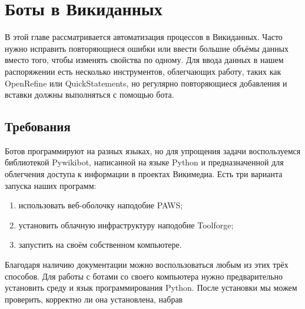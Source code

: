 \chapter{Боты в Викиданных}
\label{ch:bots}

В этой главе рассматривается автоматизация процессов в Викиданных. 
Часто нужно исправить повторяющиеся ошибки или ввести большие объёмы данных 
вместо того, чтобы изменять свойства по одному. 
Для ввода данных в нашем распоряжении есть несколько инструментов, облегчающих работу, 
таких как OpenRefine %
 или QuickStatements, но регулярно повторяющиеся добавления и вставки должны выполняться с помощью бота.


\section{Требования}

\label{sec:requirements}
Ботов программируют на разных языках, но для упрощения задачи воспользуемся библиотекой Pywikibot, 
написанной на языке Python и предназначенной для облегчения доступа 
к информации в проектах Викимедиа. Есть три варианта запуска наших программ:
\begin{enumerate}
  \item использовать веб-оболочку наподобие PAWS; 
  \item установить облачную инфраструктуру наподобие Toolforge;
  \item запустить на своём собственном компьютере.
\end{enumerate}

Благодаря наличию документации 
можно воспользоваться любым из этих трёх способов. 
Для работы с ботами со своего компьютера нужно предварительно установить среду и язык программирования Python. 
После установки мы можем проверить, 
корректно ли она установлена, 
набрав

